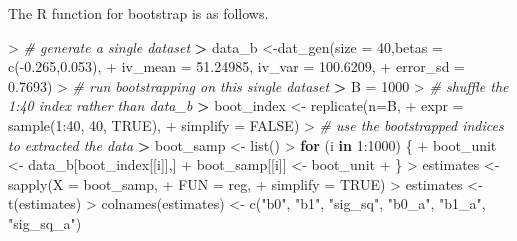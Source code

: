 \documentclass[
]{article}
\newenvironment{Shaded}{\begin{snugshade}}{\end{snugshade}}
\newcommand{\AttributeTok}[1]{\textcolor[rgb]{0.77,0.63,0.00}{#1}}
\newcommand{\CommentTok}[1]{\textcolor[rgb]{0.56,0.35,0.01}{\textit{#1}}}
\newcommand{\ConstantTok}[1]{\textcolor[rgb]{0.00,0.00,0.00}{#1}}
\newcommand{\ControlFlowTok}[1]{\textcolor[rgb]{0.13,0.29,0.53}{\textbf{#1}}}
\newcommand{\DecValTok}[1]{\textcolor[rgb]{0.00,0.00,0.81}{#1}}
\newcommand{\ErrorTok}[1]{\textcolor[rgb]{0.64,0.00,0.00}{\textbf{#1}}}
\newcommand{\FloatTok}[1]{\textcolor[rgb]{0.00,0.00,0.81}{#1}}
\newcommand{\FunctionTok}[1]{\textcolor[rgb]{0.00,0.00,0.00}{#1}}
\newcommand{\NormalTok}[1]{#1}
\newcommand{\OtherTok}[1]{\textcolor[rgb]{0.56,0.35,0.01}{#1}}
\newcommand{\SpecialCharTok}[1]{\textcolor[rgb]{0.00,0.00,0.00}{#1}}
\newcommand{\StringTok}[1]{\textcolor[rgb]{0.31,0.60,0.02}{#1}}
\begin{document}
The R function for bootstrap is as follows.

\begin{Shaded}
\begin{Highlighting}[]
\SpecialCharTok{\textgreater{}} \CommentTok{\# generate a single dataset}
\ErrorTok{\textgreater{}}\NormalTok{ data\_b }\OtherTok{\textless{}{-}}\FunctionTok{dat\_gen}\NormalTok{(}\AttributeTok{size =} \DecValTok{40}\NormalTok{,}\AttributeTok{betas =} \FunctionTok{c}\NormalTok{(}\SpecialCharTok{{-}}\FloatTok{0.265}\NormalTok{,}\FloatTok{0.053}\NormalTok{),}
\SpecialCharTok{+}                 \AttributeTok{iv\_mean =} \FloatTok{51.24985}\NormalTok{, }\AttributeTok{iv\_var =} \FloatTok{100.6209}\NormalTok{,}
\SpecialCharTok{+}                 \AttributeTok{error\_sd =} \FloatTok{0.7693}\NormalTok{)}
\SpecialCharTok{\textgreater{}} \CommentTok{\# run bootstrapping on this single dataset}
\ErrorTok{\textgreater{}}\NormalTok{ B }\OtherTok{=} \DecValTok{1000}
\SpecialCharTok{\textgreater{}} \CommentTok{\# shuffle the 1:40 index rather than data\_b}
\ErrorTok{\textgreater{}}\NormalTok{ boot\_index }\OtherTok{\textless{}{-}} \FunctionTok{replicate}\NormalTok{(}\AttributeTok{n=}\NormalTok{B,}
\SpecialCharTok{+}                        \AttributeTok{expr =} \FunctionTok{sample}\NormalTok{(}\DecValTok{1}\SpecialCharTok{:}\DecValTok{40}\NormalTok{, }\DecValTok{40}\NormalTok{, }\ConstantTok{TRUE}\NormalTok{),}
\SpecialCharTok{+}                        \AttributeTok{simplify =} \ConstantTok{FALSE}\NormalTok{)}
\SpecialCharTok{\textgreater{}} \CommentTok{\# use the bootstrapped indices to extracted the data}
\ErrorTok{\textgreater{}}\NormalTok{ boot\_samp }\OtherTok{\textless{}{-}} \FunctionTok{list}\NormalTok{()}
\SpecialCharTok{\textgreater{}} \ControlFlowTok{for}\NormalTok{ (i }\ControlFlowTok{in} \DecValTok{1}\SpecialCharTok{:}\DecValTok{1000}\NormalTok{) \{}
\SpecialCharTok{+}\NormalTok{   boot\_unit }\OtherTok{\textless{}{-}}\NormalTok{ data\_b[boot\_index[[i]],]}
\SpecialCharTok{+}\NormalTok{   boot\_samp[[i]] }\OtherTok{\textless{}{-}}\NormalTok{ boot\_unit}
\SpecialCharTok{+}\NormalTok{ \}}
\SpecialCharTok{\textgreater{}}\NormalTok{ estimates }\OtherTok{\textless{}{-}} \FunctionTok{sapply}\NormalTok{(}\AttributeTok{X =}\NormalTok{ boot\_samp,}
\SpecialCharTok{+}                     \AttributeTok{FUN =}\NormalTok{ reg,}
\SpecialCharTok{+}                     \AttributeTok{simplify =} \ConstantTok{TRUE}\NormalTok{)}
\SpecialCharTok{\textgreater{}}\NormalTok{ estimates }\OtherTok{\textless{}{-}} \FunctionTok{t}\NormalTok{(estimates)}
\SpecialCharTok{\textgreater{}} \FunctionTok{colnames}\NormalTok{(estimates) }\OtherTok{\textless{}{-}} \FunctionTok{c}\NormalTok{(}\StringTok{"b0"}\NormalTok{, }\StringTok{"b1"}\NormalTok{, }\StringTok{"sig\_sq"}\NormalTok{, }\StringTok{"b0\_a"}\NormalTok{, }\StringTok{"b1\_a"}\NormalTok{, }\StringTok{"sig\_sq\_a"}\NormalTok{)}

\end{Highlighting}
\end{Shaded}
\end{document}

